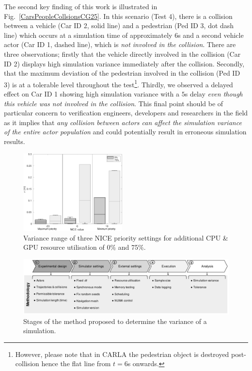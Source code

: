 The second key finding of this work is illustrated in Fig.~\ref{CarsPeopleCollsionsCG25}. In this scenario (Test 4), there is a collision between a vehicle (Car ID 2, solid line) and a pedestrian (Ped ID 3, dot dash line) which occurs at a simulation time of approximately $6$s and a second vehicle actor (Car ID 1, dashed line), which is \textit{not involved in the collision}. There are three observations; firstly that the vehicle directly involved in the collision (Car ID 2) displays high simulation variance immediately after the collision. Secondly, that the maximum deviation of the pedestrian involved in the collision (Ped ID 3) is at a tolerable level throughout the test\footnote{However, please note that in CARLA the pedestrian object is destroyed post-collision hence the flat line from $t=6$s onwards.}. Thirdly, we observed a delayed effect on Car ID 1 showing high simulation variance with a $5$s delay \textit{even though this vehicle was not involved in the collision}. This final point should be of particular concern to verification engineers, developers and researchers in the field as it implies that \textit{any collision between actors can affect the simulation variance of the entire actor population} and could potentially result in  erroneous simulation results. %

\begin{figure}[t]
    \centering
    \includegraphics[width=0.48\textwidth]{../other/figures/NICE_analysis_summary_V4.pdf}
    \caption{Variance range of three NICE priority settings for additional CPU \& GPU resource utilisation of 0\% and 75\%.}
    \label{NICEExperimentStressSummary}
\end{figure}

\begin{figure}[t]
    \centering
    \includegraphics[width=0.99\linewidth]{../other/figures/Methodology_Diagram_v7.pdf}
    \caption{Stages of the method proposed to determine the variance of a simulation.}
    \label{method_diagram}
\end{figure}

